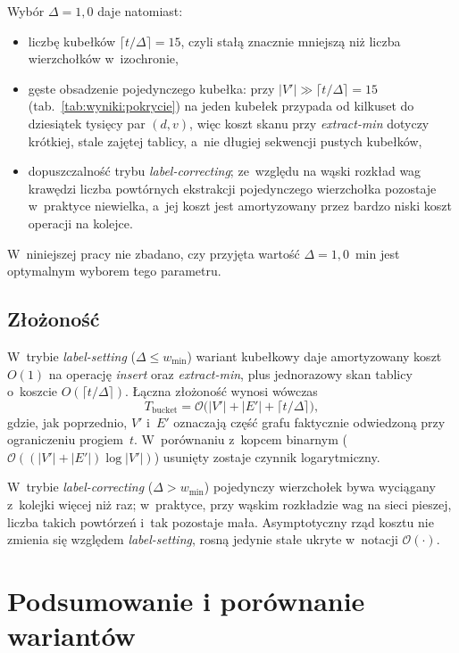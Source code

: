 \clearpage

Wybór $\Delta=1{,}0$ daje natomiast:
\begin{itemize}
  \item liczbę kubełków $\lceil t/\Delta\rceil=15$, czyli stałą znacznie
        mniejszą niż liczba wierzchołków w~izochronie,
  \item gęste obsadzenie pojedynczego kubełka: przy $|V'|\gg\lceil t/\Delta\rceil=15$
        (tab.~\ref{tab:wyniki:pokrycie}) na jeden kubełek przypada
        od kilkuset do dziesiątek tysięcy par $(d,v)$, więc koszt skanu
        przy \emph{extract-min} dotyczy krótkiej, stale zajętej tablicy,
        a~nie długiej sekwencji pustych kubełków,
  \item dopuszczalność trybu \emph{label-correcting}; ze~względu na wąski rozkład
        wag krawędzi liczba powtórnych ekstrakcji pojedynczego wierzchołka
        pozostaje w~praktyce niewielka, a~jej koszt jest amortyzowany przez
        bardzo niski koszt operacji na kolejce.
\end{itemize}

W~niniejszej pracy nie zbadano, czy przyjęta wartość $\Delta=1{,}0$~min
jest optymalnym wyborem tego parametru.

\subsection{Złożoność}
\label{subsec:warianty:bucket:zlozonosc}

W~trybie \emph{label-setting} ($\Delta\le w_{\min}$) wariant kubełkowy daje
amortyzowany koszt $O(1)$ na operację \emph{insert} oraz \emph{extract-min},
plus jednorazowy skan tablicy o~koszcie $O(\lceil t/\Delta\rceil)$.
Łączna złożoność wynosi wówczas
\[
T_{\mathrm{bucket}}=\mathcal{O}\!\bigl(|V'|+|E'|+\lceil t/\Delta\rceil\bigr),
\]
gdzie, jak poprzednio, $V'$ i~$E'$ oznaczają część grafu faktycznie odwiedzoną
przy ograniczeniu progiem~$t$. W~porównaniu z~kopcem binarnym
($\mathcal{O}((|V'|+|E'|)\log|V'|)$) usunięty zostaje czynnik logarytmiczny.

W~trybie \emph{label-correcting} ($\Delta>w_{\min}$) pojedynczy wierzchołek
bywa wyciągany z~kolejki więcej niż raz; w~praktyce, przy wąskim rozkładzie
wag na sieci pieszej, liczba takich powtórzeń i~tak pozostaje mała.
Asymptotyczny rząd kosztu nie zmienia się względem \emph{label-setting},
rosną jedynie stałe ukryte w~notacji $\mathcal{O}(\cdot)$.

\clearpage

\section{Podsumowanie i porównanie wariantów}
\label{sec:warianty:podsumowanie}

